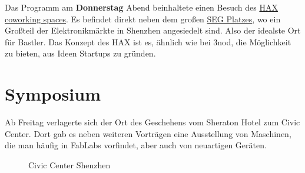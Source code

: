 \documentclass{\basedir/fablab-document}
\begin{document}
Das Programm am \textbf{Donnerstag} Abend beinhaltete einen Besuch des
\href{https://hax.co/about/}{HAX coworking spaces}. Es befindet direkt neben
dem großen \href{https://en.wikipedia.org/wiki/SEG_Plaza}{SEG Platzes},
wo ein Großteil der Elektronikmärkte in Shenzhen angesiedelt sind. Also
der idealste Ort für Bastler. Das Konzept des HAX ist es, ähnlich wie
bei 3nod, die Möglichkeit zu bieten, aus Ideen Startups zu gründen.

\section*{Symposium}

Ab Freitag verlagerte sich der Ort des Geschehens vom Sheraton Hotel zum
Civic Center. Dort gab es neben weiteren Vorträgen eine Ausstellung
von Maschinen, die man häufig in FabLabs vorfindet, aber auch von
neuartigen Geräten.

\begin{figure}[h]
	\noindent{}
	\caption{Civic Center Shenzhen}
	\label{civic_center}
\end{figure}
\end{document}
